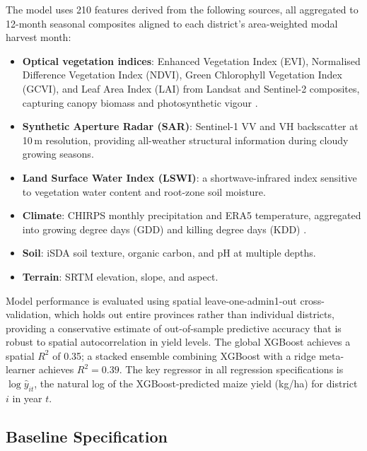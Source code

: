 The model uses 210 features derived from the following sources, all aggregated to 12-month seasonal composites aligned to each district's area-weighted modal harvest month:
\begin{itemize}
  \item \textbf{Optical vegetation indices}: Enhanced Vegetation Index (EVI), Normalised Difference Vegetation Index (NDVI), Green Chlorophyll Vegetation Index (GCVI), and Leaf Area Index (LAI) from Landsat and Sentinel-2 composites, capturing canopy biomass and photosynthetic vigour \citep{BurkeLobell2017}.
  \item \textbf{Synthetic Aperture Radar (SAR)}: Sentinel-1 VV and VH backscatter at 10\,m resolution, providing all-weather structural information during cloudy growing seasons.
  \item \textbf{Land Surface Water Index (LSWI)}: a shortwave-infrared index sensitive to vegetation water content and root-zone soil moisture.
  \item \textbf{Climate}: CHIRPS monthly precipitation and ERA5 temperature, aggregated into growing degree days (GDD) and killing degree days (KDD) \citep{Schlenker_Roberts2009}.
  \item \textbf{Soil}: iSDA soil texture, organic carbon, and pH at multiple depths.
  \item \textbf{Terrain}: SRTM elevation, slope, and aspect.
\end{itemize}

Model performance is evaluated using spatial leave-one-admin1-out cross-validation, which holds out entire provinces rather than individual districts, providing a conservative estimate of out-of-sample predictive accuracy that is robust to spatial autocorrelation in yield levels. The global XGBoost achieves a spatial $R^2$ of 0.35; a stacked ensemble combining XGBoost with a ridge meta-learner achieves $R^2 = 0.39$. The key regressor in all regression specifications is $\log\hat{y}_{it}$, the natural log of the XGBoost-predicted maize yield (kg/ha) for district $i$ in year $t$.

\subsection{Baseline Specification}

